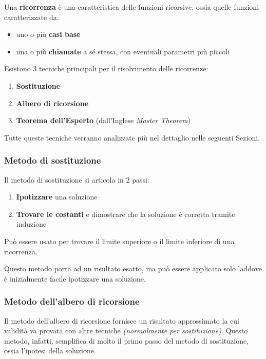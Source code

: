 \documentclass[italian, 10pt]{article}
\begin{document}
Una \textbf{ricorrenza} è una caratteristica delle funzioni ricorsive, ossia quelle funzioni caratterizzate da:

\begin{itemize}
  \item uno o più \textbf{casi base}
  \item una o più \textbf{chiamate} a sé stessa, con eventuali parametri più piccoli
\end{itemize}

Esistono \(3\) tecniche principali per il risolvimento delle ricorrenze:

\begin{enumerate}
  \item \textbf{Sostituzione}
  \item \textbf{Albero di ricorsione}
  \item \textbf{Teorema dell'Esperto} (dall'Inglese \textit{Master Theorem})
\end{enumerate}

Tutte queste tecniche verranno analizzate più nel dettaglio nelle seguenti Sezioni.

\subsubsection{Metodo di sostituzione}

Il metodo di sostituzione si articola in \(2\) passi:

\begin{enumerate}
  \item \textbf{Ipotizzare} una soluzione
  \item \textbf{Trovare le costanti} e dimostrare che la soluzione è corretta tramite induzione
\end{enumerate}

Può essere usato per trovare il limite superiore o il limite inferiore di una ricorrenza.

Questo metodo porta ad un risultato esatto, ma può essere applicato solo laddove è inizialmente facile ipotizzare una soluzione.

\subsubsection{Metodo dell'albero di ricorsione}

Il metodo dell'albero di ricorsione fornisce un risultato approssimato la cui validità va provata con altre tecniche \textit{(normalmente per sostituzione)}.
Questo metodo, infatti, semplifica di molto il primo passo del metodo di sostituzione, ossia l'ipotesi della soluzione.
\end{document}
